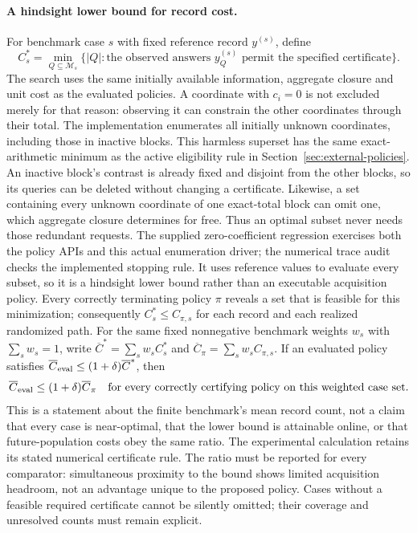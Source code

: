 \documentclass[12pt]{article}
\begin{document}
\paragraph{A hindsight lower bound for record cost.}
For benchmark case $s$ with fixed reference record $y^{(s)}$, define
\[
 C_s^*=\min_{Q\subseteq\mathcal M_s}
 \bigl\{|Q|:\text{the observed answers }y^{(s)}_Q
 \text{ permit the specified certificate}\bigr\}.
\]
The search uses the same initially available information, aggregate
closure and unit cost as the evaluated policies. A coordinate with
$c_i=0$ is not excluded merely for that reason: observing it can constrain
the other coordinates through their total. The implementation enumerates
all initially unknown coordinates, including those in inactive blocks.
This harmless superset has the same exact-arithmetic minimum as the active
eligibility rule in Section~\ref{sec:external-policies}. An inactive block's
contrast is already fixed and disjoint from the other blocks, so its
queries can be deleted without changing a certificate. Likewise, a set
containing every unknown coordinate of one exact-total block can omit
one, which aggregate closure determines for free. Thus an optimal subset
never needs those redundant requests. The supplied zero-coefficient
regression exercises both the policy APIs and this actual enumeration
driver; the numerical trace audit checks the implemented stopping rule.
It uses reference values to evaluate every subset, so it is a hindsight
lower bound rather than an executable acquisition policy.
Every correctly terminating policy $\pi$ reveals a set that is feasible
for this minimization; consequently $C_s^*\leq C_{\pi,s}$ for each record
and each realized randomized path. For the same fixed nonnegative
benchmark weights $w_s$ with $\sum_s w_s=1$, write
$\overline C^*=\sum_s w_sC_s^*$ and
$\overline C_\pi=\sum_s w_sC_{\pi,s}$.
If an evaluated policy satisfies
$\overline C_{\rm eval}\leq(1+\delta)\overline C^*$, then
\[
 \overline C_{\rm eval}\leq(1+\delta)\overline C_\pi
 \quad\text{for every correctly certifying policy on this weighted case set}.
\]
This is a statement about the finite benchmark's mean record count, not a
claim that every case is near-optimal, that the lower bound is attainable
online, or that future-population costs obey the same ratio. The
experimental calculation retains its stated numerical certificate rule.
The ratio must be reported for every comparator: simultaneous proximity
to the bound shows limited acquisition headroom, not an advantage unique
to the proposed policy. Cases without a feasible required certificate
cannot be silently omitted; their coverage and unresolved counts must
remain explicit.
\end{document}
